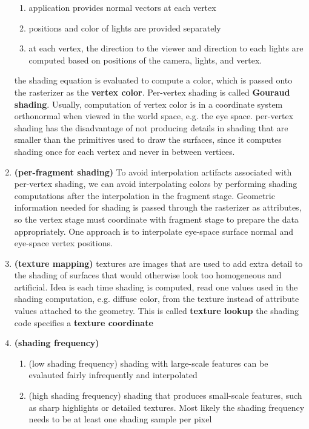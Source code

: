 \documentclass[11pt]{article}
\newcommand{\heading}[1]{(#1)}
\newcommand{\bheading}[1]{\textbf{(#1)}}
\begin{document}
\begin{enumerate}
    \begin{enumerate}
        \item application provides normal vectors at each vertex
        \item positions and color of lights are provided separately
        \item at each vertex, the direction to the viewer and direction to each lights are computed based on positions of the camera, lights, and vertex.
    \end{enumerate}
    the shading equation is evaluated to compute a color, which is passed onto the rasterizer as the \textbf{vertex color}. Per-vertex shading is called \textbf{Gouraud shading}. Usually, computation of vertex color is in a coordinate system orthonormal when viewed in the world space, e.g. the eye space. per-vertex shading has the disadvantage of not producing details in shading that are smaller than the primitives used to draw the surfaces, since it computes shading once for each vertex and never in between vertices.
    \item \bheading{per-fragment shading} To avoid interpolation artifacts associated with per-vertex shading, we can avoid interpolating colors by performing shading computations after the interpolation in the fragment stage. Geometric information needed for shading is passed through the rasterizer as attributes, so the vertex stage must coordinate with fragment stage to prepare the data appropriately. One approach is to interpolate eye-space surface normal and eye-space vertex positions.
    \item \bheading{texture mapping} textures are images that are used to add extra detail to the shading of surfaces that would otherwise look too homogeneous and artificial. Idea is each time shading is computed, read one values used in the shading computation, e.g. diffuse color, from the texture instead of attribute values attached to the geometry. This is called \textbf{texture lookup} the shading code specifies a \textbf{texture coordinate}
    \item \bheading{shading frequency} 
    \begin{enumerate}
        \item \heading{low shading frequency} shading with large-scale features can be evalauted fairly infrequently and interpolated
        \item \heading{high shading frequency} shading that produces small-scale features, such as sharp highlights or detailed textures. Most likely the shading frequency needs to be at least one shading sample per pixel
    \end{enumerate}
\end{enumerate}
\end{document}
